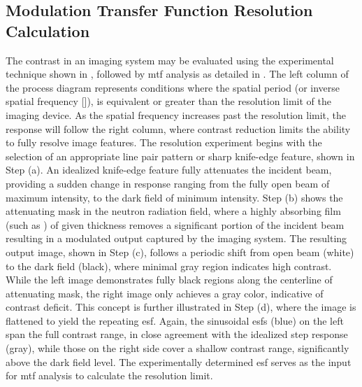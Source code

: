 \documentclass[../../../main.tex]{subfiles}%
\begin{document}
%
    \subsection{Modulation Transfer Function Resolution Calculation}%
    \label{sec:chapter-3:imaging-techniques:mtf-resolution}%
    The contrast in an imaging system may be evaluated using the experimental technique shown in , followed by \gls{mtf} analysis as detailed in .
    The left column of the process diagram represents conditions where the spatial period  (or inverse spatial frequency []), is equivalent or greater than the resolution limit  of the imaging device.
    As the spatial frequency increases past the resolution limit, the response will follow the right column, where contrast reduction limits the ability to fully resolve image features.
    The resolution experiment begins with the selection of an appropriate line pair pattern or sharp knife-edge feature, shown in Step (a).
    An idealized knife-edge feature fully attenuates the incident beam, providing a sudden change in response ranging from the fully open beam of maximum intensity, to the dark field of minimum intensity.
    Step (b) shows the attenuating mask in the neutron radiation field, where a highly absorbing film (such as ) of given thickness  removes a significant portion of the incident beam  resulting in a modulated output  captured by the imaging system. 
    The resulting output image, shown in Step (c), follows a periodic shift from open beam (white) to the dark field (black), where minimal gray region indicates high contrast.
    While the left image demonstrates fully black regions along the centerline of attenuating mask, the right image only achieves a gray color, indicative of contrast deficit. 
    This concept is further illustrated in Step (d), where the image is flattened to yield the repeating \gls{esf}.
    Again, the sinusoidal \glspl{esf} (blue) on the left span the full contrast range, in close agreement with the idealized step response (gray), while those on the right side cover a shallow contrast range, significantly above the dark field level.
    The experimentally determined \gls{esf} serves as the input for \gls{mtf} analysis to calculate the resolution limit.
\end{document}
